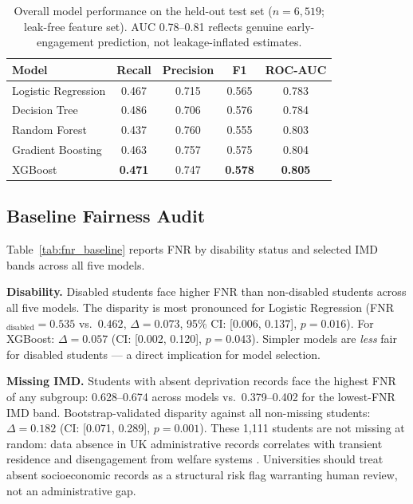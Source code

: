 \documentclass[12pt,a4paper]{article}
\begin{document}
\begin{table}[ht]
\centering
\caption{Overall model performance on the held-out test set ($n = 6{,}519$;
leak-free feature set). AUC 0.78--0.81 reflects genuine early-engagement
prediction, not leakage-inflated estimates.}
\label{tab:overall}
\small
\begin{tabular}{lcccc}
\toprule
Model & Recall & Precision & F1 & ROC-AUC \\
\midrule
Logistic Regression & 0.467 & 0.715 & 0.565 & 0.783 \\
Decision Tree       & 0.486 & 0.706 & 0.576 & 0.784 \\
Random Forest       & 0.437 & 0.760 & 0.555 & 0.803 \\
Gradient Boosting   & 0.463 & 0.757 & 0.575 & 0.804 \\
XGBoost             & \textbf{0.471} & 0.747 & \textbf{0.578} & \textbf{0.805} \\
\bottomrule
\end{tabular}
\end{table}

\subsection{Baseline Fairness Audit}

Table~\ref{tab:fnr_baseline} reports FNR by disability status and selected IMD
bands across all five models.

\textbf{Disability.} Disabled students face higher FNR than non-disabled
students across all five models. The disparity is most pronounced for Logistic
Regression (FNR$_{\text{disabled}} = 0.535$ vs.\ $0.462$, $\Delta = 0.073$,
95\% CI: [0.006, 0.137], $p = 0.016$). For XGBoost: $\Delta = 0.057$
(CI: [0.002, 0.120], $p = 0.043$). Simpler models are \textit{less} fair for
disabled students --- a direct implication for model selection.

\textbf{Missing IMD.} Students with absent deprivation records face the
highest FNR of any subgroup: 0.628--0.674 across models vs.\ 0.379--0.402 for
the lowest-FNR IMD band. Bootstrap-validated disparity against all non-missing
students: $\Delta = 0.182$ (CI: [0.071, 0.289], $p = 0.001$). These 1,111
students are not missing at random: data absence in UK administrative records
correlates with transient residence and disengagement from welfare systems
\citep{equalityact2010}. Universities should treat absent socioeconomic records
as a structural risk flag warranting human review, not an administrative gap.
\end{document}
